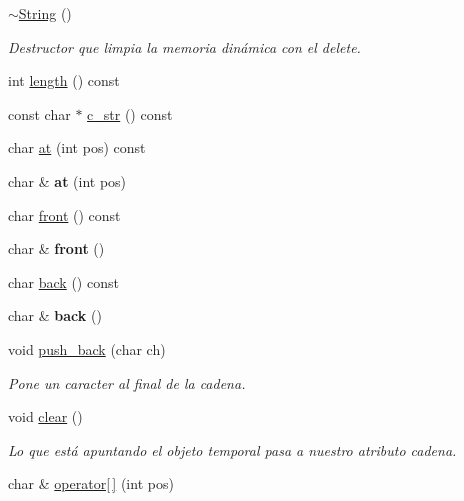 \begin{DoxyCompactItemize}
\hyperlink{class_string_ac40b2a3fb58c2d8556f5e6ff73510036}{$\sim$\+String} ()
\begin{DoxyCompactList}\small\item\em Destructor que limpia la memoria dinámica con el delete. \end{DoxyCompactList}\item 
int \hyperlink{class_string_a79366b9ecdbde9701a9acfe0009a5ded}{length} () const
\item 
const char $\ast$ \hyperlink{class_string_a0274f3e61533d15086816fb7f47ccb54}{c\+\_\+str} () const
\item 
char \hyperlink{class_string_a61572c111aa3d8af654e244ac367408e}{at} (int pos) const
\item 
\mbox{\label{class_string_ad9a9d2cba12b1db8c003edd3d9075a80}} 
char \& {\bfseries at} (int pos)
\item 
char \hyperlink{class_string_aaac2d7b67a3d6ba926365c88a16d71e6}{front} () const
\item 
\mbox{\label{class_string_a720b4d7d9da33fa63c8776479c1b2ca6}} 
char \& {\bfseries front} ()
\item 
char \hyperlink{class_string_a3ca787cbf830a5ce99e18243bd841279}{back} () const
\item 
\mbox{\label{class_string_a6324abf8bde151ab7417cfcf04220717}} 
char \& {\bfseries back} ()
\item 
void \hyperlink{class_string_a9f2d7c4ca8aa53bd86532461d700e572}{push\+\_\+back} (char ch)
\begin{DoxyCompactList}\small\item\em Pone un caracter al final de la cadena. \end{DoxyCompactList}\item 
\mbox{\label{class_string_ab5b0c43ae84247df8e5f9488a911587c}} 
void \hyperlink{class_string_ab5b0c43ae84247df8e5f9488a911587c}{clear} ()
\begin{DoxyCompactList}\small\item\em Lo que está apuntando el objeto temporal pasa a nuestro atributo cadena. \end{DoxyCompactList}\item 
\mbox{\label{class_string_a82d1c8563a9604f09e0e4e2f91ba6862}} 
char \& \hyperlink{class_string_a82d1c8563a9604f09e0e4e2f91ba6862}{operator\mbox{[}$\,$\mbox{]}} (int pos)

\end{DoxyCompactItemize}
